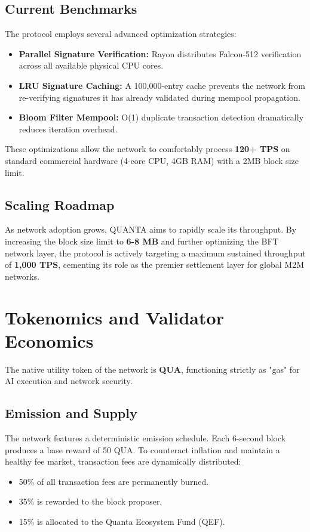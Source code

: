 \documentclass[11pt,a4paper]{article}
\begin{document}
\subsection{Current Benchmarks}
The protocol employs several advanced optimization strategies:
\begin{itemize}
    \item \textbf{Parallel Signature Verification:} Rayon distributes Falcon-512 verification across all available physical CPU cores.
    \item \textbf{LRU Signature Caching:} A 100,000-entry cache prevents the network from re-verifying signatures it has already validated during mempool propagation.
    \item \textbf{Bloom Filter Mempool:} O(1) duplicate transaction detection dramatically reduces iteration overhead.
\end{itemize}
These optimizations allow the network to comfortably process \textbf{120+ TPS} on standard commercial hardware (4-core CPU, 4GB RAM) with a 2MB block size limit.

\subsection{Scaling Roadmap}
As network adoption grows, QUANTA aims to rapidly scale its throughput. By increasing the block size limit to \textbf{6-8 MB} and further optimizing the BFT network layer, the protocol is actively targeting a maximum sustained throughput of \textbf{1,000 TPS}, cementing its role as the premier settlement layer for global M2M networks.

\section{Tokenomics and Validator Economics}
The native utility token of the network is \textbf{QUA}, functioning strictly as "gas" for AI execution and network security.

\subsection{Emission and Supply}
The network features a deterministic emission schedule. Each 6-second block produces a base reward of 50 QUA. To counteract inflation and maintain a healthy fee market, transaction fees are dynamically distributed:
\begin{itemize}
    \item 50\% of all transaction fees are permanently burned.
    \item 35\% is rewarded to the block proposer.
    \item 15\% is allocated to the Quanta Ecosystem Fund (QEF).
\end{itemize}
\end{document}
